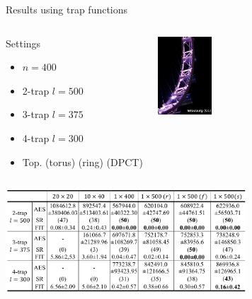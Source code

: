 \begin{frame}{Results using trap functions}


\begin{columns}
\begin{scriptsize}
\begin{block}{Settings}
 \begin{itemize}
 \item $n=400$
 \item 2-trap $l=500$ 
 \item 3-trap $l=375$ 
 \item 4-trap $l=300$
 \item Top. (torus) (ring) (DPCT)
 \end{itemize}
\end{block}
\end{scriptsize}
\includegraphics[width=2cm]{images/ringteutoburg.png} 
\end{columns}

\centering
\includegraphics[width=9cm]{images/results1.png} 

\end{frame}

